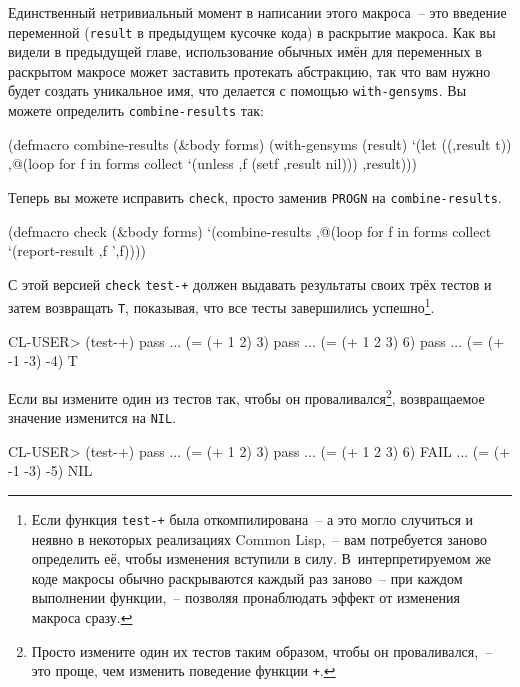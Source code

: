 Единственный нетривиальный момент в написании этого макроса~-- это введение переменной
(\lstinline{result} в предыдущем кусочке кода) в раскрытие макроса. Как вы видели в предыдущей
главе, использование обычных имён для переменных в раскрытом макросе может заставить
протекать абстракцию, так что вам нужно будет создать уникальное имя, что делается с
помощью \lstinline{with-gensyms}. Вы можете определить \lstinline{combine-results} так:

\begin{myverb}
(defmacro combine-results (&body forms)
  (with-gensyms (result)
    `(let ((,result t))
      ,@(loop for f in forms collect `(unless ,f (setf ,result nil)))
      ,result)))
\end{myverb}

Теперь вы можете исправить \lstinline{check}, просто заменив \lstinline{PROGN} на
\lstinline{combine-results}.

\begin{myverb}
(defmacro check (&body forms)
  `(combine-results
    ,@(loop for f in forms collect `(report-result ,f ',f))))
\end{myverb}

С этой версией \lstinline{check} \lstinline{test-+} должен выдавать результаты своих трёх тестов и
затем возвращать \lstinline{T}, показывая, что все тесты завершились успешно\footnote{Если
  функция \lstinline{test-+} была откомпилирована~-- а это могло случиться и неявно в
  некоторых реализациях Common Lisp,~-- вам потребуется заново определить её, чтобы
  изменения вступили в силу. В~интерпретируемом же коде макросы обычно раскрываются каждый
  раз заново~-- при каждом выполнении функции,~-- позволяя пронаблюдать эффект от
  изменения макроса сразу.}\hspace{\footnotenegspace}.

\begin{myverb}
CL-USER> (test-+)
pass ... (= (+ 1 2) 3)
pass ... (= (+ 1 2 3) 6)
pass ... (= (+ -1 -3) -4)
T
\end{myverb}

Если вы измените один из тестов так, чтобы он проваливался\footnote{Просто измените один
  их тестов таким образом, чтобы он проваливался,~-- это проще, чем изменить поведение
  функции \lstinline{+}.}\hspace{\footnotenegspace}, возвращаемое значение изменится на \lstinline{NIL}.

\begin{myverb}
CL-USER> (test-+)
pass ... (= (+ 1 2) 3)
pass ... (= (+ 1 2 3) 6)
FAIL ... (= (+ -1 -3) -5)
NIL
\end{myverb}

